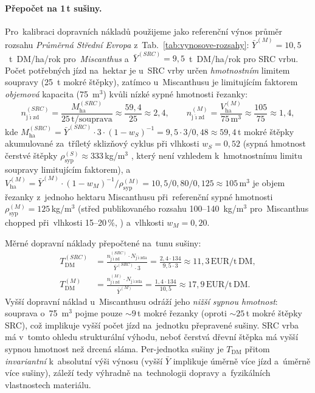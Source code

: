 \paragraph{Přepočet na 1\,t sušiny.}
Pro~kalibraci dopravních nákladů použijeme jako referenční výnos
průměr rozsahu \emph{Průměrná Střední Evropa}
z~Tab.~\ref{tab:vynosove-rozsahy}: $\bar{Y}^{(M)} = 10{,}5$~t~DM/ha/rok
pro~\textit{Miscanthus} a~$\bar{Y}^{(SRC)} = 9{,}5$~t~DM/ha/rok pro
SRC vrbu. Počet potřebných jízd na~hektar je u~SRC vrby určen
\emph{hmotnostním} limitem soupravy (25~t mokré štěpky), zatímco
u~Miscanthusu je limitujícím faktorem \emph{objemová} kapacita
(75~m$^3$) kvůli nízké sypné hmotnosti řezanky:
\begin{equation}
n_\mathrm{j\acute{\imath}zd}^{(SRC)} = \frac{M_\mathrm{ha}^{(SRC)}}{25\,\mathrm{t/souprava}}
\approx \frac{59{,}4}{25} \approx 2{,}4,
\qquad
n_\mathrm{j\acute{\imath}zd}^{(M)} = \frac{V_\mathrm{ha}^{(M)}}{75\,\mathrm{m}^3}
\approx \frac{105}{75} \approx 1{,}4,
\label{eq:n_jizd}
\end{equation}
kde $M_\mathrm{ha}^{(SRC)} = \bar{Y}^{(SRC)} \cdot 3 \cdot (1 - w_S)^{-1}
= 9{,}5 \cdot 3 / 0{,}48 \approx 59{,}4\,$t mokré štěpky akumulované
za~tříletý sklizňový cyklus při vlhkosti $w_S = 0{,}52$ (sypná
hmotnost čerstvé štěpky $\rho_\mathrm{syp}^{(S)} \approx 333\,$kg/m$^3$
\citep{Stolarski2019Chip}, který není vzhledem k~hmotnostnímu limitu
soupravy limitujícím faktorem), a~$V_\mathrm{ha}^{(M)} = \bar{Y}^{(M)}
\cdot (1 - w_M)^{-1} / \rho_\mathrm{syp}^{(M)} = 10{,}5 / 0{,}80 / 0{,}125
\approx 105\,$m$^3$ je objem řezanky z~jednoho hektaru Miscanthusu při~referenční
sypné hmotnosti $\rho_\mathrm{syp}^{(M)} = 125\,$kg/m$^3$ (střed publikovaného
rozsahu 100--140~kg/m$^3$ pro~Miscanthus chopped při~vlhkosti 15--20\,\%,
\citealp{Caslin2010,Smeets2009}) a~vlhkosti $w_M = 0{,}20$.

Měrné dopravní náklady přepočtené na~tunu sušiny:
\begin{align}
T_\mathrm{DM}^{(SRC)} &= \frac{n_\mathrm{j\acute{\imath}zd}^{(SRC)} \cdot N_\mathrm{j\acute{\imath}zda}}{\bar{Y}^{(SRC)} \cdot 3}
                       = \frac{2{,}4 \cdot 134}{9{,}5 \cdot 3}
                       \approx 11{,}3\,\mathrm{EUR/t\,DM},
\label{eq:T_DM_SRC} \\
T_\mathrm{DM}^{(M)}   &= \frac{n_\mathrm{j\acute{\imath}zd}^{(M)} \cdot N_\mathrm{j\acute{\imath}zda}}{\bar{Y}^{(M)}}
                       = \frac{1{,}4 \cdot 134}{10{,}5}
                       \approx 17{,}9\,\mathrm{EUR/t\,DM}.
\label{eq:T_DM_M}
\end{align}
Vyšší dopravní náklad u~Miscanthusu odráží jeho \emph{nižší sypnou
hmotnost}: souprava o~75~m$^3$ pojme pouze $\sim 9\,$t mokré řezanky
(oproti $\sim 25\,$t mokré štěpky SRC), což implikuje vyšší počet
jízd na~jednotku přepravené sušiny. SRC vrba má v~tomto ohledu
strukturální výhodu, neboť čerstvá dřevní štěpka má vyšší sypnou
hmotnost než drcená sláma. Per-jednotka sušiny je $T_\mathrm{DM}$
přitom \emph{invariantní} k~absolutní výši výnosu (vyšší $\bar{Y}$
implikuje úměrně více jízd a~úměrně více sušiny), záleží tedy
výhradně na~technologii dopravy a~fyzikálních vlastnostech materiálu.


